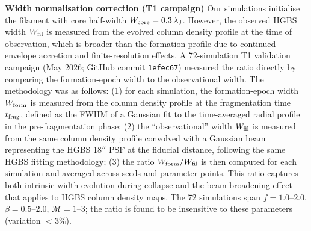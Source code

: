 \documentclass[twoside,twocolumn]{mnras}
\begin{document}
\textbf{Width normalisation correction (T1 campaign)}
\label{sec:width_correction}
Our simulations initialise the filament with core half-width $W_{\rm core} = 0.3\,\lambda_{\rm J}$. However, the observed HGBS width $W_{\rm fil}$ is measured from the evolved column density profile at the time of observation, which is broader than the formation profile due to continued envelope accretion and finite-resolution effects. A 72-simulation T1 validation campaign (May 2026; GitHub commit \texttt{1efec67}) measured the ratio directly by comparing the formation-epoch width to the observational width. The methodology was as follows: (1) for each simulation, the formation-epoch width $W_{\rm form}$ is measured from the column density profile at the fragmentation time $t_{\rm frag}$, defined as the FWHM of a Gaussian fit to the time-averaged radial profile in the pre-fragmentation phase; (2) the ``observational'' width $W_{\rm fil}$ is measured from the same column density profile convolved with a Gaussian beam representing the HGBS 18$''$ PSF at the fiducial distance, following the same HGBS fitting methodology; (3) the ratio $W_{\rm form}/W_{\rm fil}$ is then computed for each simulation and averaged across seeds and parameter points. This ratio captures both intrinsic width evolution during collapse and the beam-broadening effect that applies to HGBS column density maps. The 72 simulations span $f = 1.0$--$2.0$, $\beta = 0.5$--$2.0$, $\mathcal{M} = 1$--$3$; the ratio is found to be insensitive to these parameters (variation $<3\%$).
\end{document}
